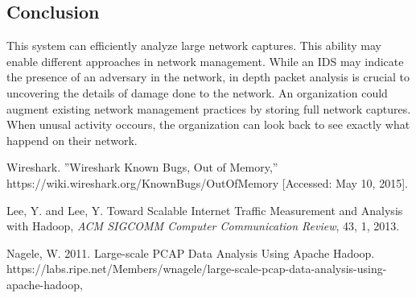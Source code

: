 \documentclass{article}
\begin{document}
\begin{multicols}{2}
\section*{Conclusion}

This system can efficiently analyze large network captures. This ability may enable different approaches in network management.  While an IDS may indicate the presence of an adversary in the network, in depth packet analysis is crucial to uncovering the details of damage done to the network.  An organization could augment existing network management practices by storing full network captures.  When unusal activity occours, the organization can look back to see exactly what happend on their network.  

\end{multicols}


\begin{thebibliography}{9}

  Wireshark.
  ''Wireshark Known Bugs, Out of Memory,''
  https://wiki.wireshark.org/KnownBugs/OutOfMemory
  [Accessed: May 10, 2015].

  
  Lee, Y. and Lee, Y.
  Toward Scalable Internet Traffic Measurement and Analysis with Hadoop,
  \emph{ACM SIGCOMM Computer Communication Review},
  43, 1, 2013.

  Nagele, W.
  2011.
  Large-scale PCAP Data Analysis Using Apache Hadoop. 
  https://labs.ripe.net/Members/wnagele/large-scale-pcap-data-analysis-using-apache-hadoop,


  
\end{thebibliography}
\end{document}
